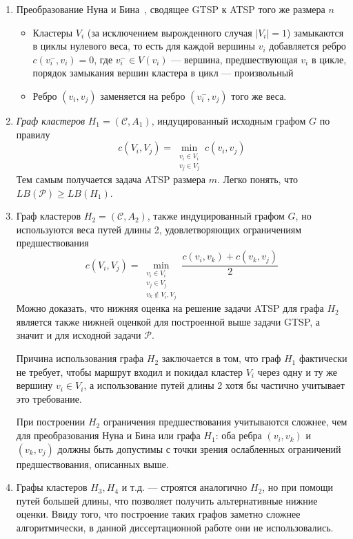 \begin{enumerate}
  \item Преобразование Нуна и Бина~\cite{NoonBean1993},
    сводящее GTSP к ATSP того же размера $n$
  \begin{itemize}
    \item
    Кластеры $V_i$
    (за исключением вырожденного случая $|V_i|=1$)
    замыкаются в циклы нулевого веса,
    то есть для каждой вершины $v_i$ добавляется ребро
    $c(v_i^-,v_i)=0$,
    где $v_i^- \in V(v_i)$ --- вершина, предшествующая $v_i$ в цикле,
    порядок замыкания вершин кластера в цикл --- произвольный
    \item
    Ребро $(v_i, v_j)$
    заменяется на ребро $(v_i^-,v_j)$
    того же веса.
  \end{itemize}
  \item
  \textit{Граф кластеров}
  $H_1 = (\mathcal C, A_1)$,
  индуцированный исходным графом $G$
  по правилу
  $$
    c(V_i, V_j)=\min_{\substack{v_i\in V_i \\ v_j \in V_j}}
    c(v_i,v_j)
  $$
  Тем самым получается задача ATSP размера $m$.
  Легко понять, что
  $LB(\mathcal P) \geqslant LB(H_1)$.
  \item
  Граф кластеров
  $H_2 = (\mathcal C, A_2)$,
  также индуцированный графом $G$,
  но используются веса путей длины 2,
  удовлетворяющих ограничениям предшествования
  $$
    c(V_i, V_j)=\min_{\substack{v_i\in V_i \\ v_j \in V_j \\ v_k\notin V_i, V_j}}
    \frac{c(v_i,v_k)+c(v_k,v_j)}{2}
  $$
  Можно доказать,
  что нижняя оценка на решение задачи ATSP
  для графа $H_2$
  является также нижней оценкой для
  построенной выше задачи GTSP,
  а значит и для исходной задачи
  $\mathcal P$.

  Причина использования графа $H_2$
  заключается в том, что
  граф $H_1$
  фактически не требует,
  чтобы маршрут входил и покидал кластер $V_i$
  через одну и ту же вершину $v_i \in V_i$,
  а использование путей длины 2
  хотя бы частично учитывает это требование.

  При построении $H_2$
  ограничения предшествования учитываются сложнее,
  чем для преобразования Нуна и Бина или графа $H_1$:
  оба ребра
  $(v_i, v_k)$ и $(v_k, v_j)$
  должны быть допустимы с точки зрения ослабленных
  ограничений предшествования,
  описанных выше.
  \item
  Графы кластеров $H_3, H_4$ и т.д. ---
  строятся аналогично $H_2$,
  но при помощи путей большей длины,
  что позволяет получить альтернативные нижние оценки.
  Ввиду того,
  что построение таких графов заметно сложнее алгоритмически,
  в данной диссертационной работе они не использовались.
\end{enumerate}

